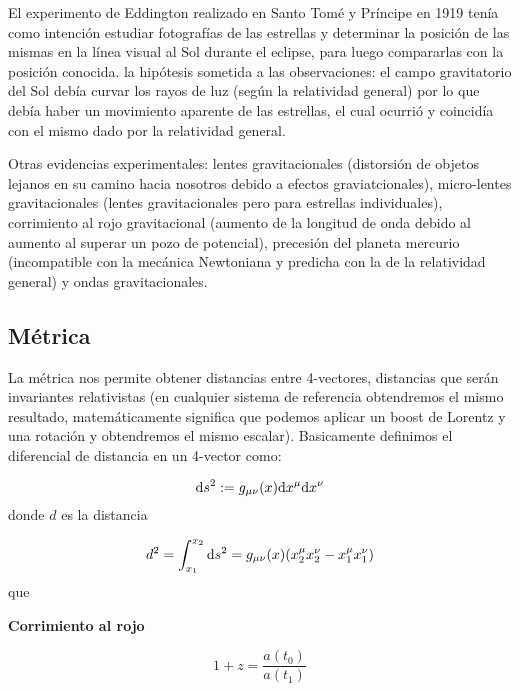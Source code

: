 El experimento de Eddington  realizado en Santo Tomé y Príncipe en 1919 tenía como intención estudiar fotografías de las estrellas y determinar la posición de las mismas en la línea visual al Sol durante el eclipse, para luego compararlas con la posición conocida. la hipótesis sometida a las observaciones: el campo gravitatorio del Sol debía curvar los rayos de luz (según la relatividad general) por lo que debía haber un movimiento aparente de las estrellas, el cual ocurrió y coincidía con el mismo dado por la relatividad general.

Otras evidencias experimentales: lentes gravitacionales (distorsión de objetos lejanos en su camino hacia nosotros debido a efectos graviatcionales), micro-lentes gravitacionales (lentes gravitacionales pero para estrellas individuales), corrimiento al rojo gravitacional (aumento de la longitud de onda debido al aumento al superar un pozo de potencial), precesión del planeta mercurio (incompatible con la mecánica Newtoniana y predicha con la de la relatividad general) y ondas gravitacionales.

\subsection{Métrica}

La métrica nos permite obtener distancias entre 4-vectores, distancias que serán invariantes relativistas (en cualquier sistema de referencia obtendremos el mismo resultado, matemáticamente significa que podemos aplicar un boost de Lorentz y una rotación y obtendremos el mismo escalar). Basicamente definimos el diferencial de distancia en un 4-vector como:

\begin{equation}
	\mathrm{d} s^2 : = g_{\mu \nu} (x) \mathrm{d} x^\mu \mathrm{d} x^\nu
\end{equation}
donde $d$ es la distancia

\begin{equation}
	d^2 = \int_{x_1}^{x_2} \mathrm{d} s^2  =  g_{\mu \nu} (x) ( x_2^\mu x_2^\nu - x_1^\mu x_1^\nu)
\end{equation}
que

\begin{Resaltar}
	\begin{center}
		\textbf{Corrimiento al rojo}
	\end{center}
	\begin{equation}
		1 + z = \frac{a(t_0)}{a(t_1)}
	\end{equation}

\end{Resaltar}
